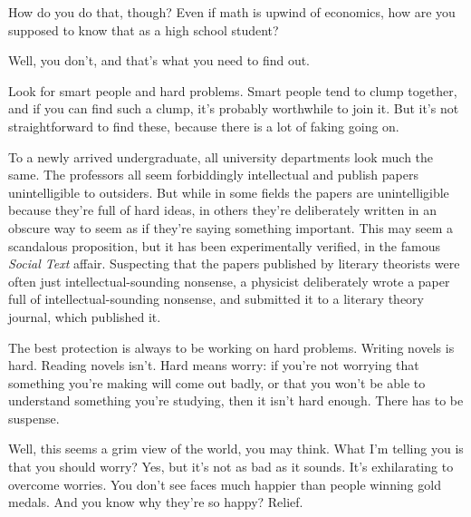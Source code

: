 How do you do that,
                  though? Even if math is upwind of economics, how are you
                  supposed to know that as a high school student?

Well,
                  you don't, and that's what you need to find out.
                  
                  Look for smart people and hard problems. Smart people tend to
                  clump together, and if you can find such a clump, it's
                  probably worthwhile to join it. But it's not straightforward
                  to find these, because there is a lot of faking going on.

To
                  a newly arrived undergraduate, all university departments look
                  much the same. The professors all seem forbiddingly
                  intellectual and publish papers unintelligible to outsiders.
                  But while in some fields the papers are unintelligible because
                  they're full of hard ideas, in others they're deliberately
                  written in an obscure way to seem as if they're saying
                  something important. This may seem a scandalous proposition,
                  but it has been experimentally verified, in the famous
                  \emph{Social Text} affair. Suspecting that the papers
                  published by literary theorists were often just
                  intellectual-sounding nonsense, a physicist deliberately wrote
                  a paper full of intellectual-sounding nonsense, and submitted
                  it to a literary theory journal, which published it.

The
                  best protection is always to be working on hard problems.
                  Writing novels is hard. Reading novels isn't. Hard means
                  worry: if you're not worrying that something you're making
                  will come out badly, or that you won't be able to understand
                  something you're studying, then it isn't hard enough. There
                  has to be suspense.

Well, this seems a grim view of
                  the world, you may think. What I'm telling you is that you
                  should worry? Yes, but it's not as bad as it sounds. It's
                  exhilarating to overcome worries. You don't see faces much
                  happier than people winning gold medals. And you know why
                  they're so happy? Relief.

